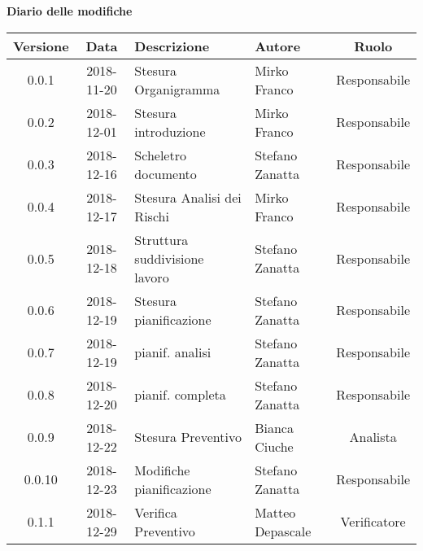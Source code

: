 	\begin{center}
		\textbf{Diario delle modifiche}
	\end{center}
	\begin{center}
		\begin{tabularx}{\textwidth}{|c|c|X|X|c|}
			\hline
			\textbf{Versione} & \textbf{Data} & \textbf{Descrizione} & \textbf{Autore} & \textbf{Ruolo} \\
			\hline
			0.0.1 & 2018-11-20 & Stesura Organigramma & Mirko Franco & Responsabile\\
			\hline
			0.0.2 & 2018-12-01 & Stesura introduzione & Mirko Franco & Responsabile\\
			\hline
			0.0.3 & 2018-12-16 & Scheletro documento &Stefano Zanatta & Responsabile\\
			\hline
			0.0.4 & 2018-12-17 & Stesura Analisi dei Rischi & Mirko Franco & Responsabile\\
			\hline
			0.0.5 & 2018-12-18 & Struttura suddivisione lavoro & Stefano Zanatta & Responsabile\\
			\hline
			0.0.6 & 2018-12-19 & Stesura pianificazione & Stefano Zanatta & Responsabile\\
			\hline
			0.0.7 & 2018-12-19 & pianif. analisi& Stefano Zanatta & Responsabile\\
			\hline
			0.0.8 & 2018-12-20 & pianif. completa& Stefano Zanatta & Responsabile\\
			\hline
			0.0.9 & 2018-12-22 & Stesura Preventivo & Bianca Ciuche & Analista\\
			\hline
			0.0.10 & 2018-12-23 & Modifiche pianificazione & Stefano Zanatta & Responsabile\\
			\hline
			0.1.1 & 2018-12-29 & Verifica Preventivo & Matteo Depascale & Verificatore\\
			\hline
			
		\end{tabularx}
	\end{center}
\newpage